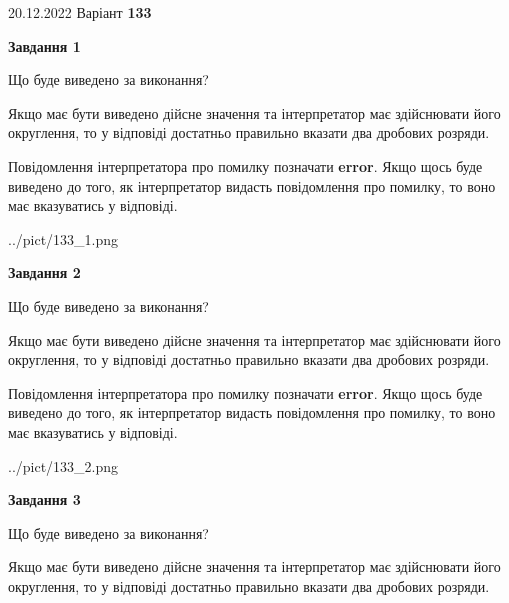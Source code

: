 \documentclass[12pt, ukrainian]{article}
\begin{document}
{20.12.2022 Варіант \No \textbf { 133 }\par}
{
\begin {Large}

{\begin {center}\textbf{Завдання 1}\end {center}}\par
Що буде виведено за виконання? \par

Якщо має бути виведено дійсне значення та інтерпретатор має здійснювати його округлення, 
то у відповіді достатньо правильно вказати два дробових розряди.

Повідомлення інтерпретатора про помилку позначати \textbf{error}.
Якщо щось буде виведено до того, як інтерпретатор видасть повідомлення про помилку, 
то воно має вказуватись у відповіді. \par

\begin{center}
	{../pict/133_1.png}
\end{center}
\newpage

{\begin {center}\textbf{Завдання 2}\end {center}}\par
Що буде виведено за виконання? \par

Якщо має бути виведено дійсне значення та інтерпретатор має здійснювати його округлення, 
то у відповіді достатньо правильно вказати два дробових розряди.

Повідомлення інтерпретатора про помилку позначати \textbf{error}.
Якщо щось буде виведено до того, як інтерпретатор видасть повідомлення про помилку, 
то воно має вказуватись у відповіді. \par

\begin{center}
	{../pict/133_2.png}
\end{center}
\newpage

{\begin {center}\textbf{Завдання 3}\end {center}}\par
Що буде виведено за виконання? \par

Якщо має бути виведено дійсне значення та інтерпретатор має здійснювати його округлення, 
то у відповіді достатньо правильно вказати два дробових розряди.


\end{Large}}
\end{document}
